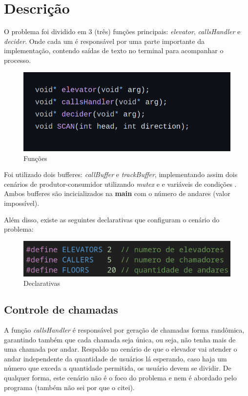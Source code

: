 \documentclass[a4paper,final,12pt]{article}
\begin{document}
\section{Descrição}\label{section:description}
O problema foi dividido em 3 (três) funções principais: \textit{elevator}, \textit{callsHandler} e \textit{decider}. Onde cada um é responsável por uma parte importante da implementação, contendo saídas de texto no terminal para acompanhar o processo.

\begin{figure}[h!]
  \includegraphics[scale=0.5]{imgs/functions.png}
  \caption{Funções}
  \label{fig:functions}
\end{figure}

Foi utilizado dois bufferes: \textit{callBuffer} e \textit{trackBuffer}, implementando assim dois cenários de produtor-consumidor utilizando \textit{mutex} e e variáveis de condições \cite{book}. Ambos bufferes são incicializados na \textbf{main} com o número de andares (valor impossível).

Além disso, existe as seguintes declarativas que configuram o cenário do problema:

\begin{figure}[h!]
  \includegraphics[scale=0.3]{imgs/declaratives.png}
  \caption{Declarativas}
  \label{fig:declaratives}
\end{figure}


\subsection{Controle de chamadas}\label{subsection:callsHandler}
A função \textit{callsHandler} é responsável por geração de chamadas forma randômica, garantindo também que cada chamada seja única, ou seja, não tenha mais de uma chamada por andar. Respaldo no cenário de que o elevador vai atender o andar independente da quantidade de usuários lá esperando, caso haja um número que exceda a quantidade permitida, os usuário devem se dividir. De qualquer forma, este cenário não é o foco do problema e nem é abordado pelo programa (também não sei por que o citei).
\end{document}

